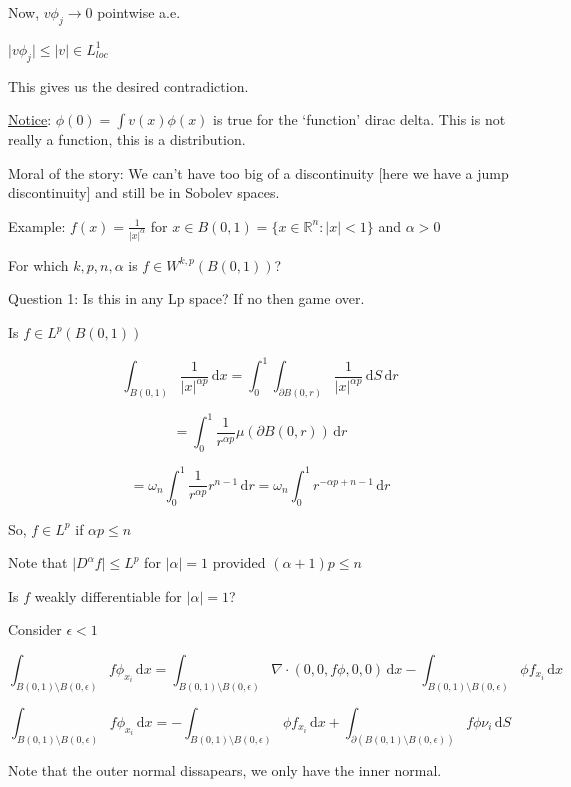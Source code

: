 \documentclass{article}
\theoremstyle{definition}
\begin{document}
Now, \(v\phi_j \to 0\) pointwise a.e.

\(\vert v \phi_j \vert \leq \vert v \vert \in L^1_{loc}\) 

This gives us the desired contradiction.

\underline{Notice}: \(\phi(0)=\int v(x)\phi(x)\) is true for the `function' dirac delta. This is not really a function, this is a distribution.

Moral of the story: We can't have too big of a discontinuity [here we have a jump discontinuity] and still be in Sobolev spaces.

Example: \(f(x) = \frac{1}{\vert x \vert ^\alpha}\) for \(x\in B(0,1) = \{ x\in\mathbb{R} ^n : \vert x \vert < 1 \} \) and \(\alpha > 0\)

For which \(k,p,n,\alpha\) is \(f\in W^{k,p}(B(0,1))\)? 

Question 1: Is this in any Lp space? If no then game over.

Is \(f\in L^p(B(0,1))\) 

\[
    \int_{B(0,1)}^{} \frac{1}{\vert x \vert ^{\alpha p}} \,\mathrm{d}x = \int_{0}^{1} \int_{\partial B(0,r)}^{} \frac{1}{\vert x \vert ^{\alpha p}} \,\mathrm{d}S  \,\mathrm{d}r 
\]

\[
    = \int_{0}^{1} \frac{1}{r^{\alpha p}} \mu (\partial B(0,r)) \,\mathrm{d}r 
\]

\[
    = \omega_n \int_{0}^{1} \frac{1}{r^{\alpha p}}r^{n-1} \,\mathrm{d}r = \omega _n \int_{0}^{1} r^{-\alpha p + n - 1} \,\mathrm{d}r 
\]

So, \(f\in L^p\) if \(\alpha p \leq n\) 

Note that \(\vert D^\alpha f \vert \leq L^p\) for \(\vert \alpha  \vert = 1\) provided \((\alpha +1)p \leq n\) 

Is \(f\) weakly differentiable for \(\vert \alpha  \vert = 1\)?

Consider \(\epsilon < 1\) 

\[
    \int_{B(0,1) \setminus B(0,\epsilon)}^{} f \phi_{x_i} \,\mathrm{d}x = \int_{B(0,1)\setminus B(0,\epsilon)}^{} \nabla \cdot (0, 0, f\phi, 0, 0) \,\mathrm{d}x - \int_{B(0,1) \setminus B(0,\epsilon)}^{} \phi f_{x_i} \,\mathrm{d}x 
\]

\[
    \int_{B(0,1)\setminus B(0,\epsilon)}^{} f \phi_{x_i} \,\mathrm{d}x = - \int_{B(0,1)\setminus B(0,\epsilon)}^{} \phi f_{x_i} \,\mathrm{d}x + \int_{\partial (B(0,1)\setminus B(0,\epsilon ))} f \phi \nu_i \,\mathrm{d}S 
\]

Note that the outer normal dissapears, we only have the inner normal.
\end{document}
